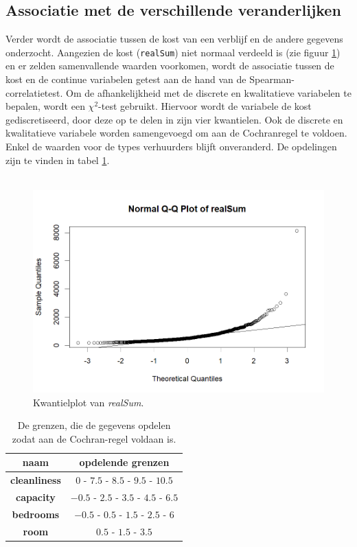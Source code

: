 \documentclass[a4paper]{kulakarticle}
\begin{document}
	\subsection{Associatie met de verschillende veranderlijken}
	
	Verder wordt de associatie tussen de kost van een verblijf en de andere gegevens onderzocht. Aangezien de kost (\verb|realSum|) niet normaal verdeeld is (zie figuur \ref{fig:qqplotvrealsum}) en er zelden samenvallende waarden voorkomen, wordt de associatie tussen de kost en de continue variabelen getest aan de hand van de Spearman-correlatietest. Om de afhankelijkheid met de discrete en kwalitatieve variabelen te bepalen, wordt een $\chi ^2$-test gebruikt. Hiervoor wordt de variabele de kost gediscretiseerd, door deze op te delen in zijn vier kwantielen. Ook de discrete en kwalitatieve variabele worden samengevoegd om aan de Cochranregel te voldoen. Enkel de waarden voor de types verhuurders blijft onveranderd. De opdelingen zijn te vinden in tabel \ref{tab:grenzen}. \\\\
	
	\begin{figure}
		\centering
		\includegraphics[width=0.7\linewidth]{Figuren/qqplotvrealSum}
		\caption{Kwantielplot van \textit{realSum}.}
		\label{fig:qqplotvrealsum}
	\end{figure}

	\begin{table}[h]
		\centering
			\begin{tabular}{c|c}
			\centering
			naam& opdelende grenzen\\
			\hline
			\textbf{cleanliness} & $ 0 $ - $ 7.5 $ - $ 8.5$ - $ 9.5 $ - $ 10.5$ \\
			\textbf{capacity}& $-0.5$ - $2.5$ - $3.5$ - $4.5$ - $6.5$\\
			\textbf{bedrooms}& $-0.5$ - $0.5$ - $1.5$ - $2.5$ - $6$\\
			\textbf{room} & $0.5$ - $1.5$ - $3.5$\\
			\end{tabular}
			\caption{De grenzen, die de gegevens opdelen zodat aan de Cochran-regel voldaan is.}
			\label{tab:grenzen}
	\end{table}
\end{document}
